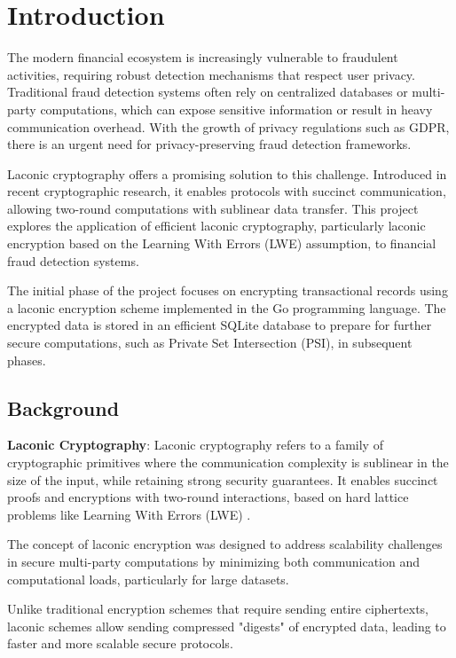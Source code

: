 \chapter{Introduction}

The modern financial ecosystem is increasingly vulnerable to fraudulent activities, requiring robust detection mechanisms that respect user privacy. Traditional fraud detection systems often rely on centralized databases or multi-party computations, which can expose sensitive information or result in heavy communication overhead. With the growth of privacy regulations such as GDPR, there is an urgent need for privacy-preserving fraud detection frameworks.

Laconic cryptography offers a promising solution to this challenge. Introduced in recent cryptographic research, it enables protocols with succinct communication, allowing two-round computations with sublinear data transfer. This project explores the application of efficient laconic cryptography, particularly laconic encryption based on the Learning With Errors (LWE) assumption, to financial fraud detection systems.

The initial phase of the project focuses on encrypting transactional records using a laconic encryption scheme implemented in the Go programming language. The encrypted data is stored in an efficient SQLite database to prepare for further secure computations, such as Private Set Intersection (PSI), in subsequent phases.

\section{Background}

\begin{definition}\label{laconic_definition}
\textbf{Laconic Cryptography}: Laconic cryptography refers to a family of cryptographic primitives where the communication complexity is sublinear in the size of the input, while retaining strong security guarantees. It enables succinct proofs and encryptions with two-round interactions, based on hard lattice problems like Learning With Errors (LWE) \cite{cryptoeprint:2023/404}.
\end{definition}

The concept of laconic encryption was designed to address scalability challenges in secure multi-party computations by minimizing both communication and computational loads, particularly for large datasets.

\begin{remark}
Unlike traditional encryption schemes that require sending entire ciphertexts, laconic schemes allow sending compressed "digests" of encrypted data, leading to faster and more scalable secure protocols.
\end{remark}

